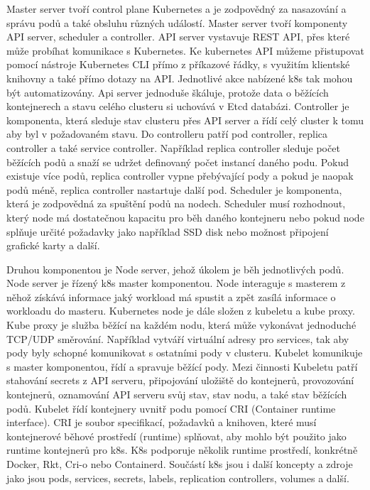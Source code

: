 Master server tvoří control plane Kubernetes a je zodpovědný za nasazování a správu podů a také obsluhu různých událostí. Master server tvoří komponenty API server, scheduler a controller. API server vystavuje REST API, přes které může probíhat komunikace s Kubernetes. Ke kubernetes API můžeme přistupovat pomocí nástroje Kubernetes CLI přímo z příkazové řádky, s využitím klientské knihovny a také přímo dotazy na API. Jednotlivé akce nabízené k8s tak mohou být automatizovány. Api server jednoduše škáluje, protože data o běžících kontejnerech a stavu celého clusteru si \linebreak uchovává v Etcd databázi. Controller je komponenta, která sleduje stav clusteru přes API server a řídí celý cluster k tomu aby byl v požadovaném stavu. Do controlleru patří pod controller, replica controller a také service controller. Například replica controller sleduje počet běžících podů a snaží se udržet definovaný počet instancí daného podu. Pokud existuje více podů, replica controller vypne přebývající pody a pokud je naopak podů méně, replica controller nastartuje další pod. Scheduler je komponenta, která je zodpovědná za spuštění podů na nodech. Scheduler musí rozhodnout, který node má dostatečnou kapacitu pro běh daného kontejneru nebo pokud node splňuje určité požadavky jako například SSD disk nebo možnost připojení grafické karty a další.     \par          
Druhou komponentou je Node server, jehož úkolem je běh jednotlivých podů. Node server je řízený k8s master komponentou. Node interaguje s masterem z něhož získává informace jaký workload má spustit a zpět zasílá informace o workloadu do masteru. Kubernetes node je dále složen z kubeletu a kube proxy. Kube proxy je služba běžící na každém nodu, která může vykonávat jednoduché TCP/UDP směrování. Například vytváří virtuální adresy pro services, tak aby pody byly schopné komunikovat s ostatními pody v clusteru. Kubelet komunikuje s master komponentou, řídí a spravuje běžící pody. Mezi činnosti Kubeletu patří stahování secrets z API serveru, připojování uložiště do kontejnerů, provozování kontejnerů, oznamování API serveru svůj stav, stav nodu, a také stav běžících podů. Kubelet řídí kontejnery uvnitř podu pomocí CRI (Container runtime interface). CRI je soubor specifikací, požadavků a knihoven, které musí kontejnerové běhové prostředí (runtime) splňovat, aby mohlo být použito jako runtime kontejnerů pro k8s. K8s podporuje několik runtime prostředí, konkrétně Docker, Rkt, Cri-o nebo Containerd. Součástí k8s jsou i další koncepty a zdroje jako jsou pods, services, secrets, labels, replication controllers, volumes a další.   \par
